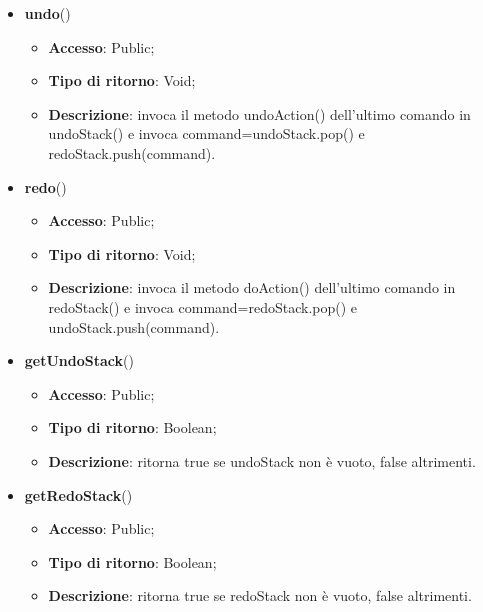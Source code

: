 {{\begin{itemize}
\begin{itemize}
		\end{itemize}
		\item \textbf{undo}()
		\begin{itemize}
			\item \textbf{Accesso}: Public;
			\item \textbf{Tipo di ritorno}: Void;
			\item \textbf{Descrizione}: invoca il metodo undoAction() dell’ultimo comando in undoStack() e invoca command=undoStack.pop() e redoStack.push(command).
		\end{itemize}
		\item \textbf{redo}()
		\begin{itemize}
			\item \textbf{Accesso}: Public;
			\item \textbf{Tipo di ritorno}: Void;
			\item \textbf{Descrizione}: invoca il metodo doAction() dell’ultimo comando in redoStack() e invoca command=redoStack.pop() e undoStack.push(command).
		\end{itemize}
		\item \textbf{getUndoStack}()
		\begin{itemize}
			\item \textbf{Accesso}: Public;
			\item \textbf{Tipo di ritorno}: Boolean;
			\item \textbf{Descrizione}: ritorna true se undoStack non è vuoto, false altrimenti.
		\end{itemize}
		\item \textbf{getRedoStack}()
		\begin{itemize}
			\item \textbf{Accesso}: Public;
			\item \textbf{Tipo di ritorno}: Boolean;
			\item \textbf{Descrizione}: ritorna true se redoStack non è vuoto, false altrimenti.
		\end{itemize}
	\end{itemize}
	
}}

